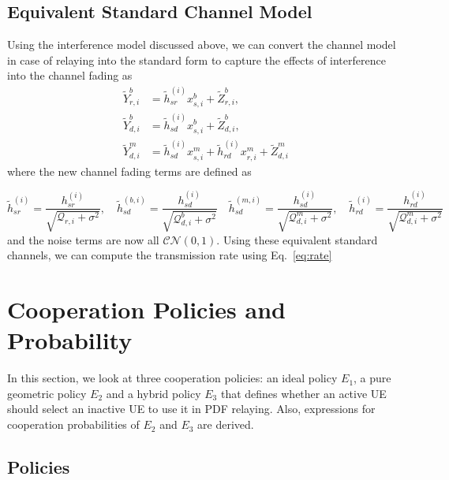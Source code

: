 \subsection{Equivalent Standard Channel Model}
Using the interference model discussed above, we can convert the channel model in case of relaying into the standard form to capture the effects of
interference into the channel fading as
\begin{align*}
\tilde{Y}_{r,i}^b &= \tilde{h}_{sr}^{(i)}x_{s,i}^b + \tilde{Z}_{r,i}^b, \\
\tilde{Y}_{d,i}^b &= \tilde{h}_{sd}^{(i)}x_{s,i}^b + \tilde{Z}_{d,i}^b, \\
\tilde{Y}_{d,i}^m &= \tilde{h}_{sd}^{(i)}x_{s,i}^m + \tilde{h}_{rd}^{(i)}x_{r,i}^m + \tilde{Z}_{d,i}^m
\end{align*}
where the new channel fading terms are defined as

\begin{equation*}
\tilde{h}_{sr}^{(i)} = \frac{h_{sr}^{(i)}}{\sqrt{\mathcal{Q}_{r,i} + \sigma^2}}, \quad \tilde{h}_{sd}^{(b,i)} = \frac{h_{sd}^{(i)}}{\sqrt{\mathcal{Q}_{d,i}^b + \sigma^2}} \quad
\tilde{h}_{sd}^{(m,i)} = \frac{h_{sd}^{(i)}}{\sqrt{\mathcal{Q}_{d,i}^m + \sigma^2}},
\quad \tilde{h}_{rd}^{(i)} = \frac{h_{rd}^{(i)}}{\sqrt{\mathcal{Q}_{d,i}^m + \sigma^2}}
\end{equation*}
and the noise terms are now all $\mathcal{CN}(0,1)$. Using these equivalent 
standard channels, we can compute the transmission rate using Eq.~\ref{eq:rate}

\section{Cooperation Policies and Probability} \label{sec:coop}
In this section, we look at three cooperation policies: an ideal policy $E_1$, a 
pure geometric policy $E_2$ and a hybrid policy $E_3$ that defines whether an active UE should select an inactive UE to use it in PDF relaying. Also, expressions for cooperation probabilities of $E_2$ and $E_3$ are derived.
\subsection{Policies}
